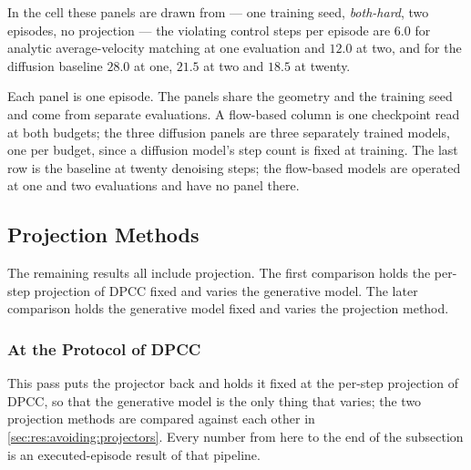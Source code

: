 In the cell these panels are drawn from --- one training seed, \emph{both-hard}, two episodes, no
projection --- the violating control steps per episode are $6.0$ for analytic average-velocity matching at one evaluation and $12.0$ at two, and for the
diffusion baseline $28.0$ at one, $21.5$ at two and $18.5$ at twenty.

Each panel is one episode. The panels share the geometry and the training seed and come from separate
evaluations. A flow-based column is one checkpoint read at both budgets; the three diffusion panels are
three separately trained models, one per budget, since a diffusion model's step count is fixed at
training. The last row is the baseline at twenty denoising steps; the flow-based models are operated at
one and two evaluations and have no panel there.

\subsection{Projection Methods}\label{sec:res:avoiding:projection}

The remaining results all include projection. The first comparison holds the per-step projection of
\ac{DPCC} fixed and varies the generative model. The later comparison holds the generative model fixed
and varies the projection method.

\subsubsection{At the Protocol of DPCC}\label{sec:res:avoiding:dpccprotocol}\label{sec:res:fewstep}

This pass puts the projector back and holds it fixed at the per-step projection of \ac{DPCC}, so that
the generative model is the only thing that varies; the two projection methods are compared against
each other in \autoref{sec:res:avoiding:projectors}. Every number from here to the end of the
subsection is an executed-episode result of that pipeline.


